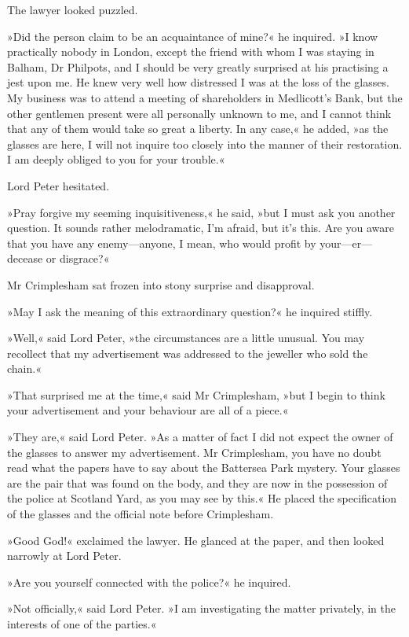 The lawyer looked puzzled.

»Did the person claim to be an acquaintance of mine?« he inquired. »I know practically nobody in London, except the friend with whom I was staying in Balham, Dr Philpots, and I should be very greatly surprised at his practising a jest upon me. He knew very well how distressed I was at the loss of the glasses. My business was to attend a meeting of shareholders in Medlicott's Bank, but the other gentlemen present were all personally unknown to me, and I cannot think that any of them would take so great a liberty. In any case,« he added, »as the glasses are here, I will not inquire too closely into the manner of their restoration. I am deeply obliged to you for your trouble.«

Lord Peter hesitated.

»Pray forgive my seeming inquisitiveness,« he said, »but I must ask you another question. It sounds rather melodramatic, I'm afraid, but it's this. Are you aware that you have any enemy—anyone, I mean, who would profit by your—er---decease or disgrace?«

Mr Crimplesham sat frozen into stony surprise and disapproval.

»May I ask the meaning of this extraordinary question?« he inquired stiffly.

»Well,« said Lord Peter, »the circumstances are a little unusual. You may recollect that my advertisement was addressed to the jeweller who sold the chain.«

»That surprised me at the time,« said Mr Crimplesham, »but I begin to think your advertisement and your behaviour are all of a piece.«

»They are,« said Lord Peter. »As a matter of fact I did not expect the owner of the glasses to answer my advertisement. Mr Crimplesham, you have no doubt read what the papers have to say about the Battersea Park mystery. Your glasses are the pair that was found on the body, and they are now in the possession of the police at Scotland Yard, as you may see by this.« He placed the specification of the glasses and the official note before Crimplesham.

»Good God!« exclaimed the lawyer. He glanced at the paper, and then looked narrowly at Lord Peter.

»Are you yourself connected with the police?« he inquired.

»Not officially,« said Lord Peter. »I am investigating the matter privately, in the interests of one of the parties.«

